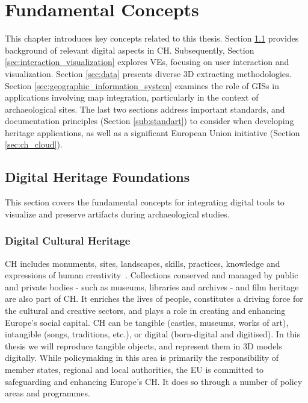 
%

\chapter{Fundamental Concepts}
\label{cha:fundamental_concepts}

This chapter introduces key concepts related to this thesis. Section \ref{sec:digital_heritage_foundation}
provides background of relevant digital aspects in \gls{CH}.
Subsequently, Section \ref{sec:interaction_visualization} explores \glspl{VE}, focusing on user interaction and visualization. 
Section \ref{sec:data} presents diverse \gls{3D} extracting methodologies.
Section \ref{sec:geographic_information_system} examines the role of \glspl{GIS} in applications involving map integration, particularly in the context of archaeological sites. 
The last two sections address important standards, and documentation principles (Section \ref{sub:standart}) to consider when developing heritage applications, as well as a significant European Union initiative (Section \ref{sec:ch_cloud}).

\section{Digital Heritage Foundations}
\label{sec:digital_heritage_foundation}

This section covers the fundamental concepts for integrating digital tools to visualize and preserve artifacts during archaeological studies.

\subsection{Digital Cultural Heritage}
\label{sec:digital_heritage}

\gls{CH} includes monuments, sites, landscapes, skills, practices, knowledge and expressions of human creativity~\cite{eu_cultural_heritage}. Collections conserved and managed by public and private bodies - such as museums, libraries and archives - and film heritage are also part of CH. It enriches the lives of people, constitutes a driving force for the cultural and creative sectors, and plays a role in creating and enhancing Europe's social capital.
\gls{CH} can be tangible (castles, museums, works of art), intangible (songs, traditions, etc.), or
digital (born-digital and digitised). In this thesis we will reproduce tangible objects, and represent them in \gls{3D} models digitally.
While policymaking in this area is primarily the responsibility of member states, regional and local authorities, the \gls{EU} is committed to safeguarding and enhancing Europe's \gls{CH}. It does so through a number of policy areas and programmes.


